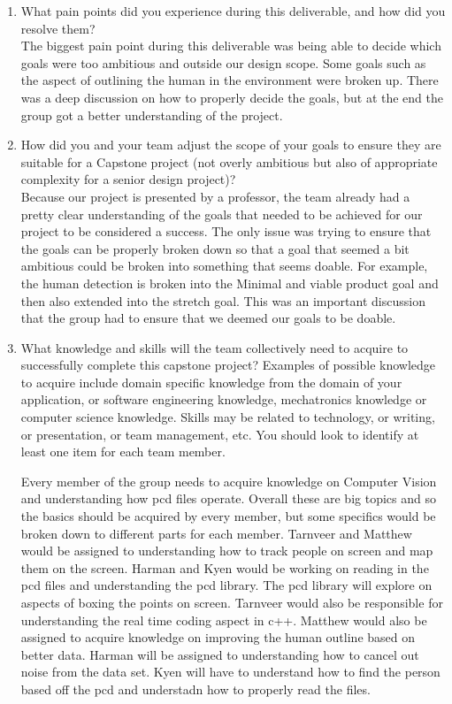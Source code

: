 \begin{enumerate}
\item What pain points did you experience during this deliverable, and how
did you resolve them?\\

The biggest pain point during this deliverable was being able to decide which goals were too ambitious and outside our design scope. Some goals such as the aspect of outlining the human 
in the environment were broken up. There was a deep discussion on how to properly decide the goals, but at the end the  group got a better understanding of the project.

\item How did you and your team adjust the scope of your goals to ensure
they are suitable for a Capstone project (not overly ambitious but also of
appropriate complexity for a senior design project)?\\

Because our project is presented by a professor, the team already had a pretty clear understanding of the goals that needed to be achieved for our project to be considered a success.
 The only issue was trying to ensure that the goals can be properly broken down so that a goal that seemed a bit ambitious could be broken into something that seems doable. For example, 
 the human detection is broken into the Minimal and viable product goal and then also extended into the stretch goal. This was an important discussion that the group had to ensure that we 
 deemed our goals to be doable.

\item What knowledge and skills will the team collectively need to acquire to successfully complete this capstone project?  Examples of possible knowledge to acquire include domain specific knowledge 
from the domain of your application, or software engineering knowledge, mechatronics knowledge or computer science knowledge.  Skills may be related to technology, or writing, or presentation, 
or team management, etc.  You should look to identify at least one item for each team member.

Every member of the group needs to acquire knowledge on Computer Vision and understanding how pcd files operate. Overall these are big topics and so the basics should be acquired by every member, but 
some specifics would be broken down to different parts for each member. Tarnveer and Matthew would be assigned to understanding how to track people on screen and map them on the screen. Harman and Kyen 
would be working on reading in the pcd files and understanding the pcd library. The pcd library will explore on aspects of boxing the points on screen. Tarnveer would also be responsible for understanding
the real time coding aspect in c++. Matthew would also be assigned to acquire knowledge on improving the human outline based on better data. Harman will be assigned to understanding how to cancel out noise
from the data set. Kyen will have to understand how to find the person based off the pcd and understadn how to properly read the files.


\end{enumerate}

